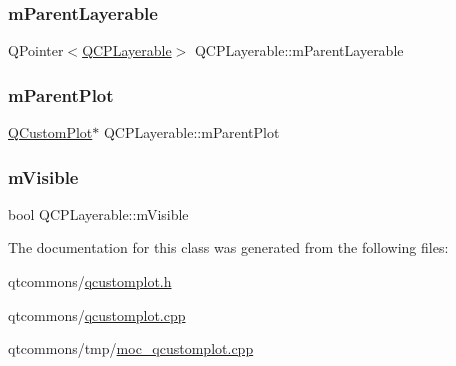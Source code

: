 \mbox{\label{class_q_c_p_layerable_a3291445a980053e2d17a21d15957624e}} 
\subsubsection{\texorpdfstring{mParentLayerable}{mParentLayerable}}
{\footnotesize\ttfamily Q\+Pointer$<$\mbox{\hyperlink{class_q_c_p_layerable}{Q\+C\+P\+Layerable}}$>$ Q\+C\+P\+Layerable\+::m\+Parent\+Layerable\hspace{0.3cm}{\ttfamily [protected]}}

\mbox{\label{class_q_c_p_layerable_aa2a528433e44db02b8aef23c1f9f90ed}} 
\subsubsection{\texorpdfstring{mParentPlot}{mParentPlot}}
{\footnotesize\ttfamily \mbox{\hyperlink{class_q_custom_plot}{Q\+Custom\+Plot}}$\ast$ Q\+C\+P\+Layerable\+::m\+Parent\+Plot\hspace{0.3cm}{\ttfamily [protected]}}

\mbox{\label{class_q_c_p_layerable_a62e3aed8427d6ce3ccf716f285106cb3}} 
\subsubsection{\texorpdfstring{mVisible}{mVisible}}
{\footnotesize\ttfamily bool Q\+C\+P\+Layerable\+::m\+Visible\hspace{0.3cm}{\ttfamily [protected]}}



The documentation for this class was generated from the following files\+:\begin{DoxyCompactItemize}
\item 
qtcommons/\mbox{\hyperlink{qcustomplot_8h}{qcustomplot.\+h}}\item 
qtcommons/\mbox{\hyperlink{qcustomplot_8cpp}{qcustomplot.\+cpp}}\item 
qtcommons/tmp/\mbox{\hyperlink{moc__qcustomplot_8cpp}{moc\+\_\+qcustomplot.\+cpp}}\end{DoxyCompactItemize}
